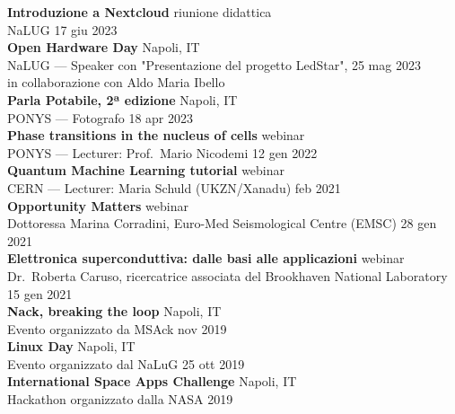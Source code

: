 \documentclass[a4paper]{article}
\begin{document}
\textbf{Introduzione a Nextcloud} \hfill riunione didattica \\
NaLUG \hfill 17 giu 2023 \\
\vspace*{2mm}
\textbf{Open Hardware Day} \hfill Napoli, IT \\
NaLUG --- Speaker con "Presentazione del progetto LedStar", \hfill 25 mag 2023 \\
in collaborazione con Aldo Maria Ibello \\
\vspace*{2mm}
\textbf{Parla Potabile, 2ª edizione} \hfill Napoli, IT \\
PONYS --- Fotografo \hfill 18 apr 2023 \\
\vspace*{2mm}
\textbf{Phase transitions in the nucleus of cells} \hfill webinar \\
PONYS --- Lecturer: Prof.\ Mario Nicodemi \hfill 12 gen 2022\\
\vspace*{2mm}
\textbf{Quantum Machine Learning tutorial} \hfill webinar\\
CERN --- Lecturer: Maria Schuld (UKZN/Xanadu) \hfill feb 2021\\
\vspace*{2mm}
\textbf{Opportunity Matters} \hfill webinar \\
Dottoressa Marina Corradini,
Euro-Med Seismological Centre (EMSC)
\hfill 28 gen 2021 \\
\vspace*{2mm}
\textbf{Elettronica superconduttiva: dalle basi alle applicazioni}
\hfill webinar \\
Dr.\ Roberta Caruso, ricercatrice associata del Brookhaven National Laboratory
\hfill 15 gen 2021 \\
\vspace*{2mm}
\textbf{Nack, breaking the loop} \hfill Napoli, IT \\
Evento organizzato da MSAck \hfill nov 2019 \\
\vspace*{2mm}
\textbf{Linux Day} \hfill Napoli, IT \\
Evento organizzato dal NaLuG \hfill 25 ott 2019 \\
\vspace*{2mm}
\textbf{International Space Apps Challenge} \hfill Napoli, IT\\
Hackathon organizzato dalla NASA
\hfill 2019\\
\vspace*{2mm}
\end{document}
